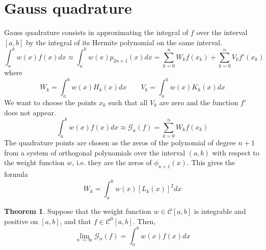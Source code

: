 \documentclass[12pt, openany]{report}
\theoremstyle{definition}
\newtheorem{thm}{Theorem}[chapter]
\begin{document}
\section{Gauss quadrature}
Gauss quadrature consists in approximating the integral of $f$ over the interval $[a,b]$ by the integral of its Hermite polynomial on the same interval. 
\begin{equation}
    \int_a^b w(x)f(x)dx \approx \int_a^b w(x)p_{2n+1}(x)dx  = \sum_{k=0}^n W_kf(x_k)+\sum_{k=0}^n V_k f'(x_k)
\end{equation}
where 
\begin{equation}
    W_k = \int_a^bw(x)H_k(x)dx \qquad V_k = \int_a^bw(x)K_k(x)dx
\end{equation}
We want to choose the points $x_k$ such that all $V_k$ are zero and the function $f'$ does not appear. \\
\begin{equation}
    \int_a^b w(x)f(x)dx \approx\mathcal{G}_n(f)= \sum_{k=0}^n W_kf(x_k)
\end{equation}
The quadrature points are chosen as the zeros of the polynomial of degree $n+1$ from a system of orthogonal polynomials over the interval $(a,b)$ with respect to the weight function $w$, i.e. they are the zeros of $\phi_{n+1}(x)$.
This gives the formula 
\begin{equation}
    W_k = \int_a^b w(x)[L_k(x)]^2dx 
\end{equation}
\begin{thm}
    Suppose that the weight function $w\in \mathcal{C}[a,b]$ is integrable and positive on $[a,b]$, and that $f\in \mathcal{C}^0[a,b]$. Then,
    \begin{equation}
        \lim_{n\rightarrow \infty}\mathcal{G}_n(f) = \int_a^b w(x)f(x)dx
    \end{equation}
\end{thm}
\end{document}
